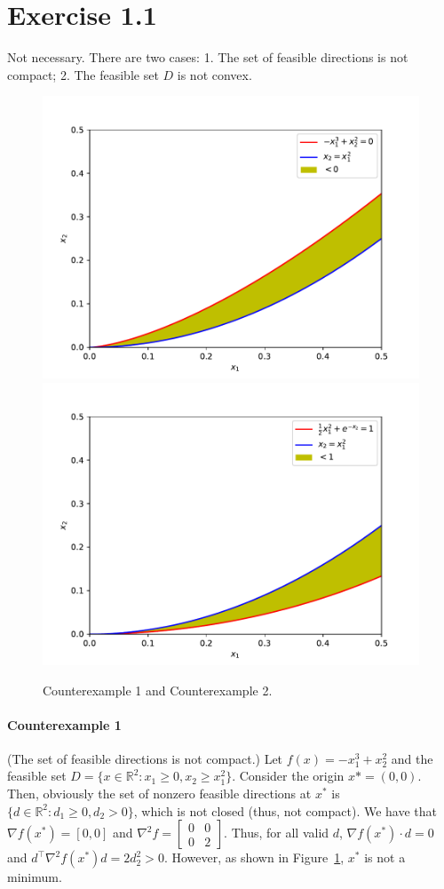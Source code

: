 \documentclass[11pt]{report}
\newcommand{\T}{\intercal}
\begin{document}

\section*{Exercise 1.1}
Not necessary. There are two cases: 1. The set of feasible directions is not compact; 2. The feasible set $D$ is not convex.
\begin{figure}
    \centering
    \includegraphics[width=0.45\linewidth]{ECE553/hw1/ece553_hw1_1.pdf}
    \includegraphics[width=0.45\linewidth]{ECE553/hw1/ece553_hw1_2.pdf}
    \caption{Counterexample 1 and Counterexample 2.}
    \label{fig:fig1}
\end{figure}
\paragraph{Counterexample 1} (The set of feasible directions is not compact.) Let $f(x) = -x_1^3 + x_2^2$ and the feasible set $D = \{x \in \mathbb{R}^2: x_1 \geq 0, x_2 \geq x_1^2\}$. Consider the origin $x* = (0, 0)$. Then, obviously the set of nonzero feasible directions at $x^*$ is $\{d\in\mathbb{R}^2: d_1 \geq 0, d_2 > 0\}$, which is not closed (thus, not compact). We have that $\nabla f(x^*) = [0, 0]$ and $\nabla^2 f = \begin{bmatrix}0 & 0\\0 & 2\end{bmatrix}$. Thus, for all valid $d$, $\nabla f(x^*) \cdot d = 0$ and $d^\T \nabla^2 f(x^*) d = 2 d_2^2 > 0$. However, as shown in Figure~\ref{fig:fig1}, $x^*$ is not a minimum.
\end{document}
